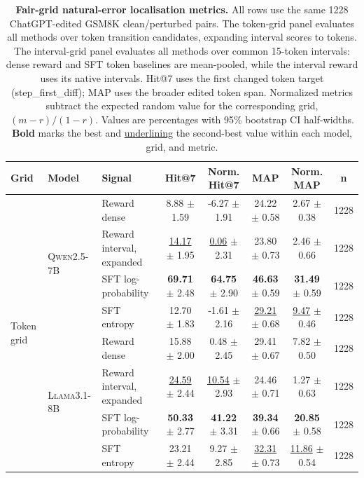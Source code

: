 \begin{table}[t]
\centering
\scriptsize
\setlength{\tabcolsep}{3pt}
\caption{\textbf{Fair-grid natural-error localisation metrics.} All rows use the same 1228 ChatGPT-edited GSM8K clean/perturbed pairs. The token-grid panel evaluates all methods over token transition candidates, expanding interval scores to tokens. The interval-grid panel evaluates all methods over common 15-token intervals: dense reward and SFT token baselines are mean-pooled, while the interval reward uses its native intervals. Hit@7 uses the first changed token target (step\_first\_diff); MAP uses the broader edited token span. Normalized metrics subtract the expected random value for the corresponding grid, $(m-r)/(1-r)$. Values are percentages with 95\% bootstrap CI half-widths. \textbf{Bold} marks the best and \underline{underlining} the second-best value within each model, grid, and metric.}
\label{tab:localisation_chatgpt_step_fair_grid_metrics}
\begin{tabular}{lllccccc}
\toprule
\textbf{Grid} & \textbf{Model} & \textbf{Signal} & \textbf{Hit@7} & \textbf{Norm. Hit@7} & \textbf{MAP} & \textbf{Norm. MAP} & \textbf{n} \\
\midrule
\multirow{12}{*}{Token grid} & \multirow{4}{*}{\textsc{Qwen2.5-7B}} & Reward dense & 8.88 $\pm$ 1.59 & -6.27 $\pm$ 1.91 & 24.22 $\pm$ 0.58 & 2.67 $\pm$ 0.38 & 1228 \\
 &  & Reward interval, expanded & \underline{14.17} $\pm$ 1.95 & \underline{0.06} $\pm$ 2.31 & 23.80 $\pm$ 0.73 & 2.46 $\pm$ 0.66 & 1228 \\
 &  & SFT log-probability & \textbf{69.71} $\pm$ 2.48 & \textbf{64.75} $\pm$ 2.90 & \textbf{46.63} $\pm$ 0.59 & \textbf{31.49} $\pm$ 0.59 & 1228 \\
 &  & SFT entropy & 12.70 $\pm$ 1.83 & -1.61 $\pm$ 2.16 & \underline{29.21} $\pm$ 0.68 & \underline{9.47} $\pm$ 0.46 & 1228 \\
\addlinespace[1pt]
 & \multirow{4}{*}{\textsc{Llama3.1-8B}} & Reward dense & 15.88 $\pm$ 2.00 & 0.48 $\pm$ 2.45 & 29.41 $\pm$ 0.67 & 7.82 $\pm$ 0.50 & 1228 \\
 &  & Reward interval, expanded & \underline{24.59} $\pm$ 2.44 & \underline{10.54} $\pm$ 2.93 & 24.46 $\pm$ 0.71 & 1.27 $\pm$ 0.63 & 1228 \\
 &  & SFT log-probability & \textbf{50.33} $\pm$ 2.77 & \textbf{41.22} $\pm$ 3.31 & \textbf{39.34} $\pm$ 0.66 & \textbf{20.85} $\pm$ 0.58 & 1228 \\
 &  & SFT entropy & 23.21 $\pm$ 2.44 & 9.27 $\pm$ 2.85 & \underline{32.31} $\pm$ 0.73 & \underline{11.86} $\pm$ 0.54 & 1228 \\

\end{tabular}
\end{table}
